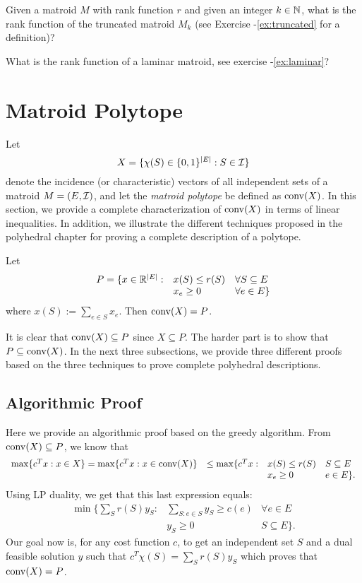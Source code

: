 \documentclass[12pt]{article}
\begin{document}
\begin{exercises}
\item
Given a matroid $M$ with rank function $r$ and given an integer
$k\in{\mathbb N}$, what is the rank function of the truncated matroid $M_k$
(see Exercise -\ref{ex:truncated} for a definition)?
\item
What is the rank function of a laminar matroid, see exercise -\ref{ex:laminar}?
\end{exercises}

\section{Matroid Polytope}

Let $$X=\{\chi(S)\in\{0,1\}^{|E|}: S\in {\cal I}\}$$ denote the
incidence (or characteristic) vectors of all independent sets of a
matroid $M=(E,{\cal I})$, and let the {\it matroid polytope} be
defined as $\operatorname{conv}(X)$. In this section, we provide a complete
characterization of $\operatorname{conv}(X)$ in terms of linear inequalities. In
addition, we illustrate the different techniques proposed in the
polyhedral chapter for proving a complete description of a polytope. 

\begin{theorem} \label{matpol}
Let $$\begin{array}{rll} 
P = \{x\in {\mathbb R}^{|E|}: & x(S) \leq r(S) & \forall S\subseteq E \\
& x_e \geq 0 & \forall e\in E\}
\end{array}$$
where $x(S):=\sum_{e\in S} x_e$.
Then $\operatorname{conv}(X)=P$. 
\end{theorem}

It is clear that $\operatorname{conv}(X) \subseteq P$ since $X\subseteq P$. The
harder part is to show that $P\subseteq \operatorname{conv}(X)$. In the next three
subsections, we provide three different proofs based on the three
techniques to prove complete polyhedral descriptions. 

\subsection{Algorithmic Proof}

Here we provide an algorithmic proof based on the greedy
algorithm. From $\operatorname{conv}(X) \subseteq P$, we know that 
$$\begin{array}{lcll}
\max\{c^T x: x\in X\} = \max\{c^Tx: x\in \operatorname{conv}(X)\} & \leq 
\max\{c^Tx: & 
x(S) \leq r(S) & S\subseteq E \\
& & x_e \geq 0 & e\in E\}.
\end{array}
$$
Using LP duality, we get that this last expression equals:
$$\begin{array}{lcll}
\min\{\sum_S r(S) y_S: & \sum_{S:
  e\in S} y_S \geq c(e) & \forall e\in E \\
& y_S\geq 0 & S\subseteq E\}.
\end{array}
$$
Our goal now is, for any cost function $c$, to get an independent set
$S$ and a dual feasible solution $y$ such that $c^T \chi(S) = \sum_S
r(S) y_S$ which proves that $\operatorname{conv}(X)=P$. 
\end{document}
